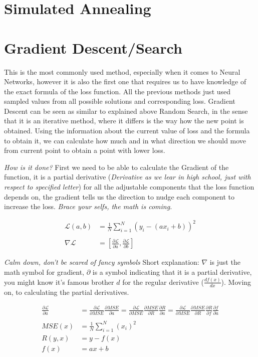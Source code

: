 \documentclass{article}
\begin{document}
\section{Simulated Annealing}

\section{Gradient Descent/Search}

This is the most commonly used method, especially when it comes to Neural Networks, however it is also the first one that requires us to have knowledge of the exact formula of the loss function. All the previous methods just used sampled values from all possible solutions and corresponding loss. Gradient Descent can be seen as similar to explained above Random Search, in the sense that it is an iterative method, where it differs is the way how the new point is obtained. Using the information about the current value of loss and the formula to obtain it, we can calculate how much and in what direction we should move from current point to obtain a point with lower loss.

\textit{How is it done?} First we need to be able to calculate the Gradient of the function, it is a partial derivative (\textit{Derivative as we lear in high school, just with respect to specified letter}) for all the adjustable components that the loss function depends on, the gradient tells us the direction to nudge each component to increase the loss. \textit{Brace your selfs, the math is coming.}

\begin{align*}
    \mathcal{L}(a,b) &= \frac{1}{N}\sum_{i=1}^N{(y_i - (ax_i + b))^2}\\\\
    \nabla\mathcal{L} &= \left[\frac{\partial \mathcal L}{\partial a}, \frac{\partial \mathcal L}{\partial b}\right]
\end{align*}

\textit{Calm down, don't be scared of fancy symbols} Short explanation: $\nabla$ is just the math symbol for gradient, $\partial$ is a symbol indicating that it is a partial derivative, you might know it's famous brother $d$ for the regular derivative ($\frac{df(x)}{dx}$). Moving on, to calculating the partial derivatives.

\begin{align*}
    \frac{\partial\mathcal L}{\partial a} &= \frac{\partial\mathcal L}{\partial MSE} \frac{\partial MSE}{\partial a} = \frac{\partial\mathcal L}{\partial MSE} \frac{\partial MSE}{\partial R}\frac{\partial R}{\partial a} = \frac{\partial\mathcal L}{\partial MSE} \frac{\partial MSE}{\partial R}\frac{\partial R}{\partial f} \frac{\partial f}{\partial a} \\\\
    MSE(x) &= \frac{1}{N}\sum^N_{i=1}(x_i)^2 \\
    R(y, x) &= y - f(x) \\
    f(x) &= ax + b
\end{align*}
\end{document}
